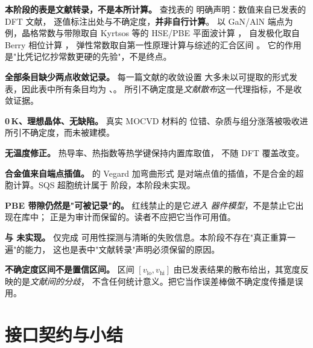 \begin{bounds}
  \item \textbf{本阶段的表是文献转录，不是本所计算。} 查找表的
         明确声明：数值来自已发表的 DFT 文献，
        逐值标注出处与不确定度，\textbf{并非自行计算}。
        以 GaN/AlN 端点为例，晶格常数与带隙取自
        Kyrtsos 等的 HSE/PBE 平面波计算 \cite{kyrtsos2019}，
        自发极化取自 Berry 相位计算 \cite{bernardini1997,dreyer2016}，
        弹性常数取自第一性原理计算与综述的汇合区间 \cite{vurgaftman2003}。
        它的作用是"比凭记忆抄常数更硬的先验"，不是终点。

  \item \textbf{全部条目缺少两点收敛记录。} 每一篇文献的收敛设置
        大多未以可提取的形式发表，因此表中所有条目均为
        、。
        所引不确定度是\emph{文献散布}这一代理指标，不是收敛证据。

  \item \textbf{0\,K、理想晶体、无缺陷。} 真实 MOCVD 材料的
        位错、杂质与组分涨落被吸收进所引不确定度，而未被建模。

  \item \textbf{无温度修正。} 热导率、热指数等热学键保持内置库取值，
        不随 DFT 覆盖改变。

  \item \textbf{合金值来自端点插值。}  的 Vegard 加弯曲形式
        是对端点值的插值，不是合金的超胞计算。SQS 超胞统计属于
         阶段，本阶段未实现。

  \item \textbf{PBE 带隙仍然是"可被记录"的。} 红线禁止的是它\emph{进入
        器件模型}，不是禁止它出现在库中；
        正是为审计而保留的。读者不应把它当作可用值。

  \item \textbf{ 与  未实现。} 仅完成
        可用性探测与清晰的失败信息。本阶段不存在"真正重算一遍"的能力，
        这也是表中"文献转录"声明必须保留的原因。

  \item \textbf{不确定度区间不是置信区间。} 区间 $[v_{\text{lo}},v_{\text{hi}}]$
        由已发表结果的散布给出，其宽度反映的是\emph{文献间的分歧}，
        不含任何统计意义。把它当作误差棒做不确定度传播是误用。
\end{bounds}

\section{接口契约与小结}
\label{sec:dft-interface}

